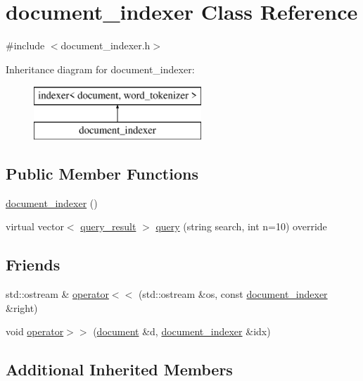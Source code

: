 \hypertarget{classdocument__indexer}{}\section{document\+\_\+indexer Class Reference}
\label{classdocument__indexer}


{\ttfamily \#include $<$document\+\_\+indexer.\+h$>$}

Inheritance diagram for document\+\_\+indexer\+:\begin{figure}[H]
\begin{center}
\leavevmode
\includegraphics[height=2.000000cm]{classdocument__indexer}
\end{center}
\end{figure}
\subsection*{Public Member Functions}
\begin{DoxyCompactItemize}
\item 
\hyperlink{classdocument__indexer_a569b5a1dc381efce6ab2ab64644a7662}{document\+\_\+indexer} ()
\item 
virtual vector$<$ \hyperlink{classquery__result}{query\+\_\+result} $>$ \hyperlink{classdocument__indexer_acdb8dcbe7827e775ab8d64e79212ea36}{query} (string search, int n=10) override
\end{DoxyCompactItemize}
\subsection*{Friends}
\begin{DoxyCompactItemize}
\item 
std\+::ostream \& \hyperlink{classdocument__indexer_aa6925b3d886b1c21f2138ded7b5b05dc}{operator$<$$<$} (std\+::ostream \&os, const \hyperlink{classdocument__indexer}{document\+\_\+indexer} \&right)
\item 
void \hyperlink{classdocument__indexer_ad495ee25cb53dba20e9c8de1d0ce22e4}{operator$>$$>$} (\hyperlink{classdocument}{document} \&d, \hyperlink{classdocument__indexer}{document\+\_\+indexer} \&idx)
\end{DoxyCompactItemize}
\subsection*{Additional Inherited Members}


